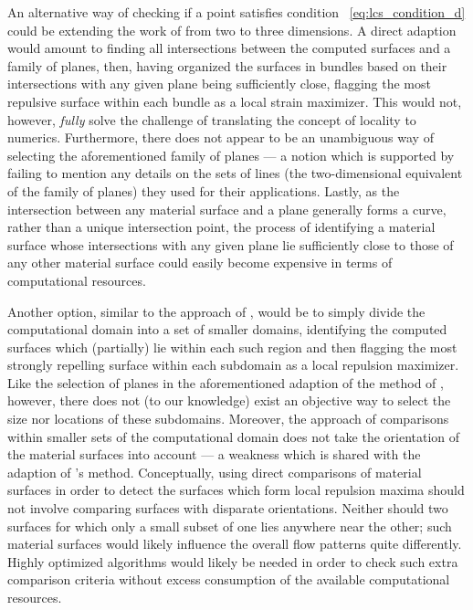 An alternative way of checking if a point satisfies condition~%
\eqref{eq:lcs_condition_d} could be extending the work of
\textcite{farazmand2012computing} from two to three dimensions. A direct
adaption would amount to finding all intersections between the computed
surfaces and a family of planes, then, having organized the surfaces in bundles
based on their intersections with any given plane being sufficiently close,
flagging the most repulsive surface within each bundle as a local strain
maximizer. This would not, however, \emph{fully} solve the challenge of
translating the concept of locality to numerics. Furthermore, there does not
appear to be an unambiguous way of selecting the aforementioned family of
planes --- a notion which is supported by \textcite{farazmand2012computing}
failing to mention any details on the sets of lines (the two-dimensional
equivalent of the family of planes) they used for their applications. Lastly,
as the intersection between any material surface and a plane generally forms a
curve, rather than a unique intersection point, the process of identifying a
material surface whose intersections with any given plane lie sufficiently
close to those of any other material surface could easily become expensive in
terms of computational resources.

Another option, similar to the approach of \textcite{farazmand2012computing},
would be to simply divide the computational domain into a set of smaller
domains, identifying the computed surfaces which (partially) lie within each
such region and then flagging the most strongly repelling surface within each
subdomain as a local repulsion maximizer. Like the selection of planes in the
aforementioned adaption of the method of \citeauthor{farazmand2012computing},
however, there does not (to our knowledge) exist an objective way to select
the size nor locations of these subdomains. Moreover, the approach of
comparisons within smaller sets of the computational domain does not take the
orientation of the material surfaces into account --- a weakness which is
shared with the adaption of \citeauthor{farazmand2012computing}'s method.
Conceptually, using direct comparisons of material surfaces in order to detect
the surfaces which form local repulsion maxima should not involve comparing
surfaces with disparate orientations. Neither should two surfaces for which
only a small subset of one lies anywhere near the other; such material surfaces
would likely influence the overall flow patterns quite differently. Highly
optimized algorithms would likely be needed in order to check such extra
comparison criteria without excess consumption of the available computational
resources.

